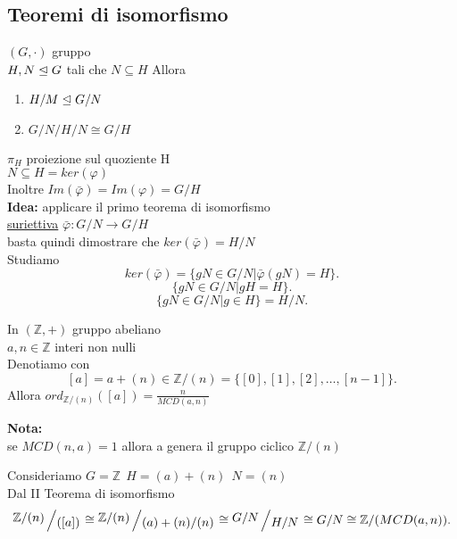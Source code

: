 \documentclass[12px]{article}
\begin{document}
	\subsection{Teoremi di isomorfismo}
	\begin{teo}
		$(G,\cdot)$ gruppo\\
		$H,N\trianglelefteq G$ tali che $N\subseteq H$ Allora
		 \begin{enumerate}
			 \item$ H/M\trianglelefteq G/N $
			 \item $G/N/H/N \cong G/H$
		 \end{enumerate}
	\end{teo}
	\begin{dimo}
$\pi_H$ proiezione sul quoziente H\\
$N\subseteq H = ker ( \varphi)$ \\
Inoltre $Im( \bar\varphi) = Im( \varphi) = G/H$\\
\textbf{Idea:} applicare il primo teorema di isomorfismo\\
\underline{suriettiva} $\bar \varphi: G/N \rightarrow G/H$\\
basta quindi dimostrare che $ker (\bar \varphi) = H/N$\\
Studiamo
\[
ker(\bar \varphi) = \lbrace gN\in G/N | \bar \varphi(gN) = H\rbrace
.\] 
\[
	\{gN\in G/N | gH = H\}
.\] 
\[
	\{gN\in G/N | g\in H\} = H/N
.\] 
	\end{dimo}
	\begin{coro}
		In $(\mathbb Z, +)$ gruppo abeliano\\$a,n\in \mathbb Z$ interi non nulli\\
		Denotiamo con
		\[
			[a] = a + (n) \in \mathbb Z/(n) = \{ [0],[1],[2],\ldots,[n-1]\}
		.\] 
		Allora $ord_{\mathbb Z/(n)}([a]) = \frac n {MCD(a,n)}$
	\end{coro}
	\textbf{Nota:}\\
	se $MCD(n,a) = 1$ allora a genera il gruppo ciclico  $\mathbb Z/(n)$
	 \begin{dimo}
		Consideriamo $G=\mathbb Z \ \ H = (a) + (n) \ \ N= (n)$\\
		Dal II Teorema di isomorfismo
		 \[
			 \bigslant{\mathbb Z/(n)}{([a])
			 }\cong\bigslant{\mathbb Z/(n)}{(a) + (n)/(n)} \cong \bigslant {G/N}{H/N}\cong G/N \cong \mathbb Z/(MCD(a,n))
		.\] 
	\end{dimo}
\end{document}
